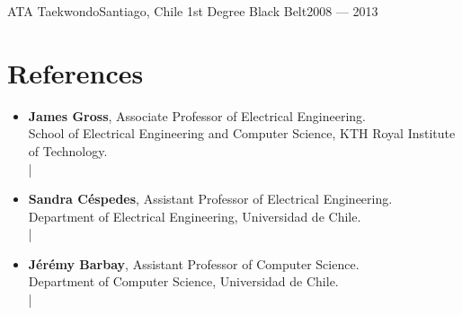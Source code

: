 \documentclass[letterpaper,11pt]{article}
\begin{document}
\resumeSubheading
{ATA Taekwondo}{Santiago, Chile}
{1st Degree Black Belt}{2008 --- 2013}

\resumeSubHeadingListEnd

\section{References}
\begin{itemize}[leftmargin=*]
  \item \textbf{James Gross}, Associate Professor of Electrical Engineering.\\
  School of Electrical Engineering and Computer Science, KTH Royal Institute of Technology.\\
   | \\

  \item \textbf{Sandra Céspedes}, Assistant Professor of Electrical Engineering.\\
  Department of Electrical Engineering, Universidad de Chile.\\
   | \\

  \item \textbf{Jérémy Barbay}, Assistant Professor of Computer Science.\\
  Department of Computer Science, Universidad de Chile.\\
   | \\
\end{itemize}

%


\end{document}
